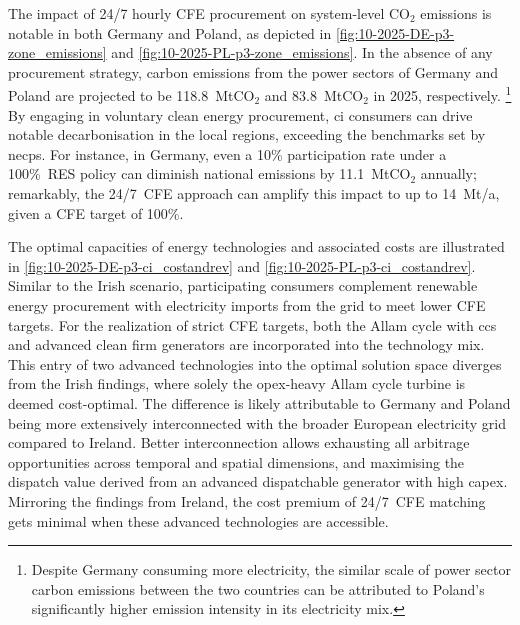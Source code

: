 The impact of 24/7 hourly CFE procurement on system-level CO$_2$ emissions is notable in both Germany and Poland, as depicted in \cref{fig:10-2025-DE-p3-zone_emissions} and \cref{fig:10-2025-PL-p3-zone_emissions}.
In the absence of any procurement strategy, carbon emissions from the power sectors of Germany and Poland are projected to be 118.8~MtCO$_2$ and 83.8~MtCO$_2$ in 2025, respectively.%
\footnote{Despite Germany consuming more electricity, the similar scale of power sector carbon emissions between the two countries can be attributed to Poland's significantly higher emission intensity in its electricity mix.} 
By engaging in voluntary clean energy procurement, \gls{ci} consumers can drive notable decarbonisation in the local regions, exceeding the benchmarks set by \gls{necp}s.
For instance, in Germany, even a 10\% participation rate under a 100\%~RES policy can diminish national emissions by 11.1~MtCO$_2$ annually; remarkably, the 24/7~CFE approach can amplify this impact to up to 14~Mt\co/a, given a CFE target of 100\%. 

The optimal capacities of energy technologies and associated costs are illustrated in \cref{fig:10-2025-DE-p3-ci_costandrev} and \cref{fig:10-2025-PL-p3-ci_costandrev}.
Similar to the Irish scenario, participating consumers complement renewable energy procurement with electricity imports from the grid to meet lower CFE targets. 
For the realization of strict CFE targets, both the Allam cycle with \gls{ccs} and advanced clean firm generators are incorporated into the technology mix. 
This entry of two advanced technologies into the optimal solution space diverges from the Irish findings, where solely the \gls{opex}-heavy Allam cycle turbine is deemed cost-optimal. 
The difference is likely attributable to Germany and Poland being more extensively interconnected with the broader European electricity grid compared to Ireland. 
Better interconnection allows exhausting all arbitrage opportunities across temporal and spatial dimensions, and maximising the dispatch value derived from an advanced dispatchable generator with high \gls{capex}.
Mirroring the findings from Ireland, the cost premium of 24/7~CFE matching gets minimal when these advanced technologies are accessible.

